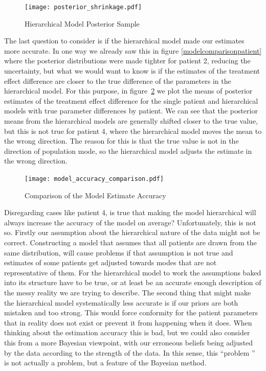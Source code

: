 \documentclass[12pt,a4paper,leqno]{report}
\theoremstyle{plain}
\theoremstyle{definition}
\theoremstyle{remark}
\begin{document}
\bigskip
\begin{figure}[H]
    \caption{Hierarchical Model Posterior Sample}\label{posteriorshrinkage}
    \bigskip
    \centering
    \texttt{[image: posterior\_shrinkage.pdf]}
\end{figure}
\bigskip

The last question to consider is if the hierarchical model made our estimates more
accurate. In one way we already saw this in figure \ref{modelcomparisonpatient} where the posterior distributions were made
tighter for patient 2, reducing the uncertainty, but what we would want to know is if the
estimates of the treatment effect difference are closer to the true difference of the
parameters in the hierarchical model. For this purpose, in figure\
\ref{modelaccuracycomparison} we plot the means of posterior
estimates of the treatment effect difference for the single patient and hierarchical models
with true parameter differences by patient. We can see that the posterior means from the
hierarchical models are generally shifted closer to the true value, but this is not true
for patient 4, where the hierarchical model moves the mean to the wrong direction. The
reason for this is that the true value is not in the direction of population mode, so
the hierarchical model adjusts the estimate in the wrong direction.

\bigskip
\begin{figure}[H]
    \caption{Comparison of the Model Estimate Accuracy}\label{modelaccuracycomparison}
    \bigskip
    \centering
    \texttt{[image: model\_accuracy\_comparison.pdf]}
\end{figure}
\bigskip

Disregarding cases like patient 4, is true that making the model hierarchical will always
increase the accuracy of the model on average? Unfortunately, this is not so. Firstly our
assumption about the hierarchical nature of the data might not be correct. Constructing
a model that assumes that all patients are drawn from the same distribution, will cause
problems if that assumption is not true and estimates of some patients get adjusted towards
modes that are not representative of them. For the hierarchical model to work the
assumptions baked into its structure have to be true, or at least be an accurate enough
description of the messy reality we are trying to describe. The second thing that might make
the hierarchical model systematically less accurate is if our priors are both mistaken
and too strong. This would force conformity for the patient parameters that in reality
does not exist or prevent it from happening when it does. When thinking about the
estimation accuracy this is bad, but we could also consider this from a more Bayesian
viewpoint, with our erroneous beliefs being adjusted by the data according to the
strength of the data. In this sense, this ``problem '' is not actually a problem, but a
feature of the Bayesian method.
\end{document}
